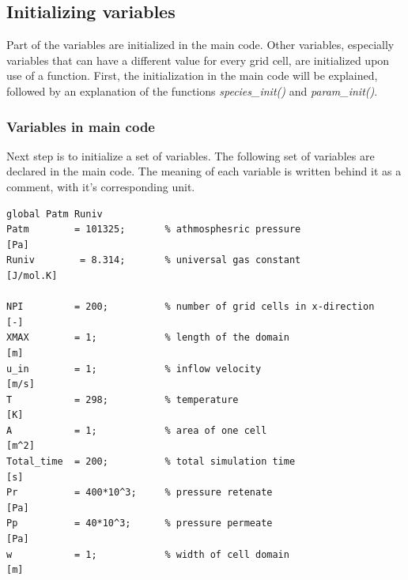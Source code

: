 \subsection{Initializing variables}
Part of the variables are initialized in the main code. Other variables, especially variables that can have a different value for every grid cell, are initialized upon use of a function. First, the initialization in the main code will be explained, followed by an explanation of the functions \textit{species\_init()} and \textit{param\_init()}. 
\subsubsection{Variables in main code}
Next step is to initialize a set of variables. The following set of variables are declared in the main code. The meaning of each variable is written behind it as a comment, with it's corresponding unit. 

\begin{lstlisting}[firstnumber={34}]
%% initializing
global Patm Runiv      
Patm        = 101325;       % athmosphesric pressure 				[Pa]
Runiv        = 8.314;		% universal gas constant 				[J/mol.K]

NPI         = 200;          % number of grid cells in x-direction 	[-] 
XMAX        = 1;            % length of the domain 					[m]
u_in        = 1;            % inflow velocity 						[m/s]
T           = 298;          % temperature 							[K]
A           = 1;            % area of one cell 						[m^2]
Total_time  = 200;          % total simulation time 				[s]
Pr          = 400*10^3;     % pressure retenate 					[Pa]
Pp          = 40*10^3;      % pressure permeate 					[Pa]
w           = 1;            % width of cell domain 					[m]
\end{lstlisting}

\newpage
